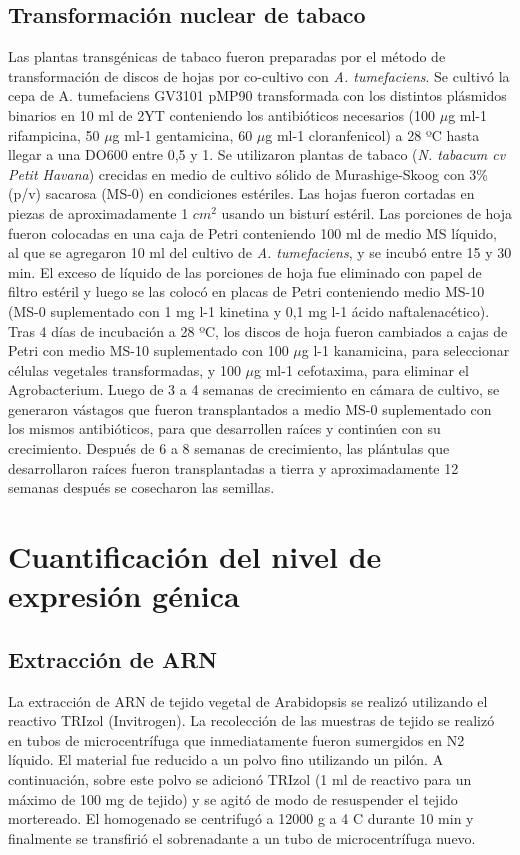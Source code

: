 \subsection{Transformación nuclear de tabaco}
Las plantas transgénicas de tabaco fueron preparadas por el método de transformación de discos de hojas por co-cultivo con \textit{A. tumefaciens}.
Se cultivó la cepa de A. tumefaciens GV3101 pMP90 transformada con los distintos plásmidos binarios en 10 ml de 2YT conteniendo los antibióticos necesarios (100 $\mu$g ml-1 rifampicina, 50 $\mu$g ml-1 gentamicina, 60 $\mu$g ml-1 cloranfenicol) a 28 ºC hasta llegar a una DO600 entre 0,5 y 1.
Se utilizaron plantas de tabaco (\textit{N. tabacum cv Petit Havana}) crecidas en medio de cultivo sólido de Murashige-Skoog con 3\% (p/v) sacarosa (MS-0) en condiciones estériles.
Las hojas fueron cortadas en piezas de aproximadamente 1 $cm^2$ usando un bisturí estéril.
Las porciones de hoja fueron colocadas en una caja de Petri conteniendo 100 ml de medio MS líquido, al que se agregaron 10 ml del cultivo de \textit{A. tumefaciens}, y se incubó entre 15 y 30 min.
El exceso de líquido de las porciones de hoja fue eliminado con papel de filtro estéril y luego se las colocó en placas de Petri conteniendo medio MS-10 (MS-0 suplementado con 1 mg l-1 kinetina y 0,1 mg l-1 ácido naftalenacético).
Tras 4 días de incubación a 28 ºC, los discos de hoja fueron cambiados a cajas de Petri con medio MS-10 suplementado con 100 $\mu$g l-1 kanamicina, para seleccionar células vegetales transformadas, y 100 $\mu$g ml-1 cefotaxima, para eliminar el Agrobacterium.
Luego de 3 a 4 semanas de crecimiento en cámara de cultivo, se generaron vástagos que fueron transplantados a medio MS-0 suplementado con los mismos antibióticos, para que desarrollen raíces y continúen con su crecimiento.
Después de 6 a 8 semanas de crecimiento, las plántulas que desarrollaron raíces fueron transplantadas a tierra y aproximadamente 12 semanas después se cosecharon las semillas.

\section{Cuantificación del nivel de expresión génica}

\subsection{Extracción de ARN}
La extracción de ARN de tejido vegetal de Arabidopsis se realizó utilizando el reactivo TRIzol (Invitrogen).
La recolección de las muestras de tejido se realizó en tubos de microcentrífuga que inmediatamente fueron sumergidos en N2 líquido.
El material fue reducido a un polvo fino utilizando un pilón. A continuación, sobre este polvo se adicionó TRIzol (1 ml de reactivo para un máximo de 100 mg de tejido) y se agitó de modo de resuspender el tejido mortereado.
El homogenado se centrifugó a 12000 g a 4 \degree C durante 10 min y finalmente se transfirió el sobrenadante a un tubo de microcentrífuga nuevo.


